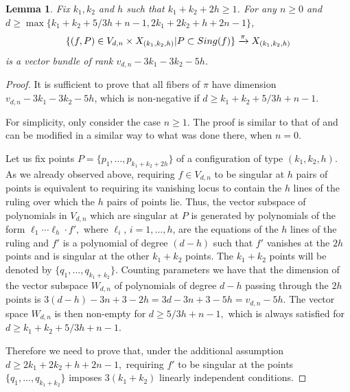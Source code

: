 \documentclass[10pt,a4paper,twoside]{amsart}
\theoremstyle{plain}
\newtheorem{lem}[theo]{Lemma}
\theoremstyle{definition}
\theoremstyle{remark}
\begin{document}
\begin{lem}\label{codim}
Fix $k_1, k_2$ and $h$ such that $k_1+k_2+2h\geq1$. For any $n\geq 0$ and $d\geq \operatorname{max}\{k_1+k_2+5/3h+n-1,2k_1+2k_2+h+2n-1\}$, 
$$\{(f,P)\in V_{d,n}\times X_{(k_1,k_2,h)}|P
\subset\emph{Sing}(f)\}\xrightarrow{\pi} X_{(k_1,k_2,h)}$$
is a vector bundle of rank $v_{d,n}-3k_1-3k_2-5h$.
\end{lem}

\begin{proof}
It is sufficient to prove that all fibers of $\pi$ have dimension $v_{d,n}-3k_1-3k_2-5h$, which is non-negative if $d\geq k_1+k_2+5/3h+n-1$.

For simplicity, only consider the case $n\geq1$. The proof is similar to that of \cite[Lemma 2.6]{Zhe} and can be modified in a similar way to what was done there, when $n=0$.

Let us fix points $P=\{p_1,\dots,p_{k_1+k_2+2h}\}$ of a configuration of type $(k_1,k_2,h)$. 
As we already observed above, requiring $f\in V_{d,n}$ to be singular at $h$ pairs of points is equivalent to requiring its vanishing locus to contain the $h$ lines of the ruling over which the $h$ pairs of points lie.
Thus, the vector subspace of polynomials in $V_{d,n}$ which are singular at $P$ is generated by polynomials of the form
$\ell_1\cdots\ell_h\cdot f',$
where $\ell_i,\,i=1,\dots,h$, are the equations of the $h$ lines of the ruling and $f'$ is a polynomial of degree $(d-h)$ such that $f'$ vanishes at the $2h$ points and is singular at the other $k_1+k_2$ points. The $k_1+k_2$ points will be denoted by $\{q_1,\dots,q_{k_1+k_2}\}$. Counting parameters we have that the dimension of the vector subspace $W_{d,n}$ of polynomials of degree $d-h$ passing through the $2h$ points is $3(d-h)-3n+3-2h=3d-3n+3-5h=v_{d,n}-5h$. The vector space $W_{d,n}$ is then non-empty for $d\geq5/3h+n-1,$ which is always satisfied for $d\geq k_1+k_2+5/3h+n-1$.

Therefore we need to prove that, under the additional assumption $d\geq 2k_1+2k_2+h+2n-1,$ requiring $f'$ to be singular at the points $\{q_1,\dots,q_{k_1+k_2}\}$ imposes $3(k_1+k_2)$ linearly independent conditions.


\end{proof}
\end{document}
